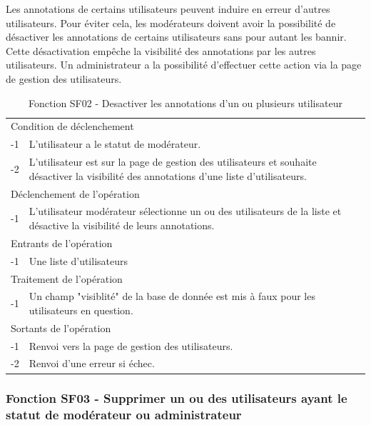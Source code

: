 \documentclass[a4paper]{article}
\begin{document}
Les annotations de certains utilisateurs peuvent induire en erreur d'autres utilisateurs. Pour éviter cela, les modérateurs doivent avoir la possibilité de désactiver les annotations de certains utilisateurs sans pour autant les bannir. Cette désactivation empêche la visibilité des annotations par les autres utilisateurs. Un administrateur a la possibilité d'effectuer cette action via la page de gestion des utilisateurs. 

\begin{table}[H]
  \centering
   \small
	\begin{tabular}{|c|p{12cm}|}
   		\hline
   			\rowcolor{lightgray}\multicolumn{2}{|c|}{\textbf{Fonction SF02 - Désactiver les annotations d'un ou plusieurs utilisateur}} \\
   		\hline
   			\multicolumn{2}{|l|}{Condition de déclenchement} \\
   		\hline
   			-1 & L'utilisateur a le statut de modérateur.\\
        	-2 & L'utilisateur est sur la page de gestion des utilisateurs et souhaite désactiver la visibilité des annotations d'une liste d'utilisateurs.\\
   		\hline
   			\multicolumn{2}{|l|}{Déclenchement de l'opération} \\
   		\hline
   			-1 & L'utilisateur modérateur sélectionne un ou des utilisateurs de la liste et désactive la visibilité de leurs annotations.\\
   		\hline
   			\multicolumn{2}{|l|}{Entrants de l'opération} \\
   		\hline
   			-1 & Une liste d'utilisateurs\\
   		\hline
   			\multicolumn{2}{|l|}{Traitement de l'opération} \\
  		\hline
   			-1 & Un champ "visiblité" de la base de donnée est mis à faux pour les utilisateurs en question.\\
   		\hline
   			\multicolumn{2}{|l|}{Sortants de l'opération} \\
   		\hline
   			-1 & Renvoi vers la page de gestion des utilisateurs.\\
        	-2 & Renvoi d'une erreur si échec.\\
   		\hline
	\end{tabular}
  \caption{Fonction SF02 - Desactiver les annotations d'un ou plusieurs utilisateur}
  \normalsize
  \label{tab: desactiver_utilisateur}
\end{table}

\subsubsection{Fonction SF03 - Supprimer un ou des utilisateurs ayant le statut de modérateur ou administrateur}
\end{document}
